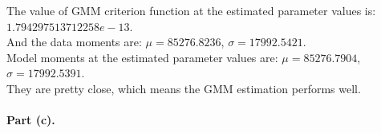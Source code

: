 \documentclass[letterpaper,12pt]{article}
\theoremstyle{definition}
\begin{document}
\begin{figure}[htb]\centering\captionsetup{width=4.0in}
  \label{Fig1b}
\end{figure}
\newpage
\noindent
The value of GMM criterion function at the estimated parameter values is: $1.794297513712258e-13$.\\
And the data moments are: $\mu = 85276.8236$, $\sigma = 17992.5421$.\\
Model moments at the estimated parameter values are: $\mu = 85276.7904$, $\sigma = 17992.5391$.\\
They are pretty close, which means the GMM estimation performs well.\\
\\
\noindent\textbf{Part (c).}
\end{document}
